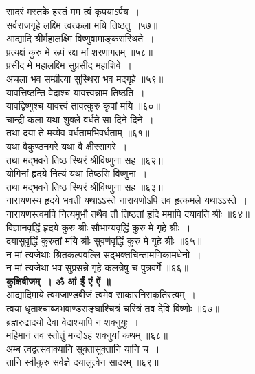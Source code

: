 \documentclass[twoside,top=1.7cm, bottom=1.7cm, outer=1cm,landscape, inner=1.5cm,a5paper,]{book}
\begin{document}
\begin{center}
\newpage
सादरं मस्तके हस्तं मम त्वं कृपयाऽर्पय~।\\
सर्वराजगृहे लक्ष्मि त्वत्कला मयि तिष्ठतु ॥५७॥\\[10pt]
आद्यादि श्रीर्महालक्ष्मि विष्णुवामाङ्कसंस्थिते~।\\
प्रत्यक्षं कुरु मे रूपं रक्ष मां शरणागतम् ॥५८॥\\[10pt]
प्रसीद मे महालक्ष्मि सुप्रसीद महाशिवे~।\\
अचला भव सम्प्रीत्या सुस्थिरा भव मद्गृहे ॥५९॥\\[10pt]
यावत्तिष्ठन्ति वेदाश्च यावत्त्वन्नाम तिष्ठति~।\\
यावद्विष्णुश्च यावत्त्वं तावत्कुरु कृपां मयि ॥६०॥\\[10pt]
\newpage
चान्द्री कला यथा शुक्ले वर्धते सा दिने दिने~।\\
तथा दया ते मय्येव वर्धतामभिवर्धताम् ॥६१॥\\[10pt]
यथा वैकुण्ठनगरे यथा वै क्षीरसागरे~।\\
तथा मद्भवने तिष्ठ स्थिरं श्रीविष्णुना सह ॥६२॥\\[10pt]
योगिनां हृदये नित्यं यथा तिष्ठसि विष्णुना~।\\
तथा मद्भवने तिष्ठ स्थिरं श्रीविष्णुना सह ॥६३॥\\[10pt]
नारायणस्य हृदये भवती यथाऽऽस्ते नारायणोऽपि तव हृत्कमले यथाऽऽस्ते~।\\
नारायणस्त्वमपि नित्यमुभौ तथैव तौ तिष्ठतां हृदि ममापि दयावति श्रीः ॥६४॥\\[10pt]
\newpage
विज्ञानवृद्धिं हृदये कुरु श्रीः सौभाग्यवृद्धिं कुरु मे गृहे श्रीः~।\\
दयासुवृद्धिं कुरुतां मयि श्रीः सुवर्णवृद्धिं कुरु मे गृहे श्रीः ॥६५॥\\[10pt]
न मां त्यजेथाः श्रितकल्पवल्लि सद्भक्तचिन्तामणिकामधेनो~।\\
न मां त्यजेथा भव सुप्रसन्ने गृहे कलत्रेषु च पुत्रवर्गे ॥६६॥\\[10pt]
{\bfseries कुक्षिबीजम्~। ॐ आं ईं एं ऐं ॥}\\[10pt]
आद्यादिमाये त्वमजाण्डबीजं त्वमेव साकारनिराकृतिस्त्वम्~।\\
त्वया धृताश्चाब्जभवाण्डसङ्घाश्चित्रं चरित्रं तव देवि विष्णोः ॥६७॥\\[10pt]
ब्रह्मरुद्रादयो देवा वेदाश्चापि न शक्नुयुः~।\\
महिमानं तव स्तोतुं मन्दोऽहं शक्नुयां कथम् ॥६८॥\\[10pt]
अम्ब त्वद्वत्सवाक्यानि सूक्तासूक्तानि यानि च~।\\
तानि स्वीकुरु सर्वज्ञे दयालुत्वेन सादरम् ॥६९॥\\[10pt]

\end{center}
\end{document}
